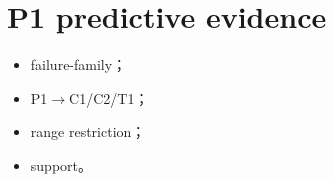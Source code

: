 \section{P1 predictive evidence}

\begin{itemize}
  \item failure-family；
  \item P1\(\rightarrow\)C1/C2/T1；
  \item range restriction；
  \item support。
\end{itemize}
